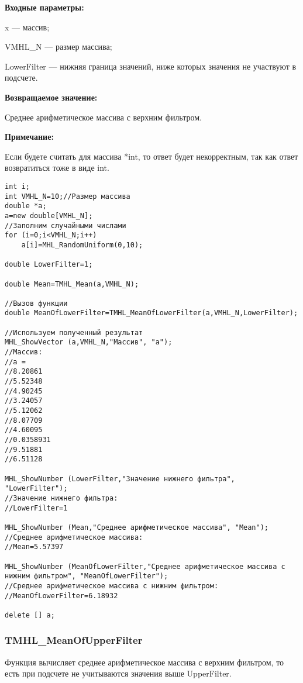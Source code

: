 \documentclass[a4paper,12pt]{article}
\begin{document}
\textbf{Входные параметры:}

 x --- массив;
 
 VMHL\_N --- размер массива;
 
 LowerFilter --- нижняя граница значений, ниже которых значения не участвуют в подсчете.

\textbf{Возвращаемое значение:}

 Среднее арифметическое массива с верхним фильтром.
 
\textbf{Примечание:}

Если будете считать для массива *int, то ответ будет некорректным, так как ответ возвратиться тоже в виде int.
 



\begin{lstlisting}[label=code_use_TMHL_MeanOfLowerFilter,caption=Пример использования]
int i;
int VMHL_N=10;//Размер массива
double *a;
a=new double[VMHL_N];
//Заполним случайными числами
for (i=0;i<VMHL_N;i++)
    a[i]=MHL_RandomUniform(0,10);

double LowerFilter=1;

double Mean=TMHL_Mean(a,VMHL_N);

//Вызов функции
double MeanOfLowerFilter=TMHL_MeanOfLowerFilter(a,VMHL_N,LowerFilter);

//Используем полученный результат
MHL_ShowVector (a,VMHL_N,"Массив", "a");
//Массив:
//a =	
//8.20861
//5.52348
//4.90245
//3.24057
//5.12062
//8.07709
//4.60095
//0.0358931
//9.51881
//6.51128

MHL_ShowNumber (LowerFilter,"Значение нижнего фильтра", "LowerFilter");
//Значение нижнего фильтра:
//LowerFilter=1

MHL_ShowNumber (Mean,"Среднее арифметическое массива", "Mean");
//Среднее арифметическое массива:
//Mean=5.57397

MHL_ShowNumber (MeanOfLowerFilter,"Среднее арифметическое массива с нижним фильтром", "MeanOfLowerFilter");
//Среднее арифметическое массива с нижним фильтром:
//MeanOfLowerFilter=6.18932

delete [] a;
\end{lstlisting}

\subsubsection{TMHL\_MeanOfUpperFilter}\label{TMHL_MeanOfUpperFilter}

Функция вычисляет среднее арифметическое массива с верхним фильтром, то есть при подсчете не учитываются значения выше UpperFilter.
\end{document}
